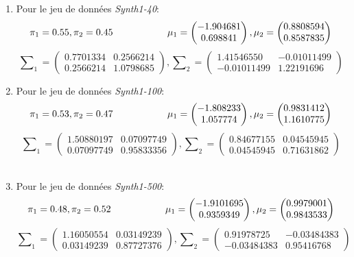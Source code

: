 \documentclass[a4paper,11pt]{article}
\begin{document}
\begin{enumerate}
  \item Pour le jeu de données \textit{Synth1-40}:
  \[ \pi_1  = 0.55, \pi_2  = 0.45 \hspace*{2cm} 
  \mu_1  = \begin{pmatrix}
    -1.904681 \\ 0.698841
  \end{pmatrix},
  \mu_2  = \begin{pmatrix}
    0.8808594 \\ 0.8587835
  \end{pmatrix}\]
  \[ \sum\nolimits_1 = \begin{pmatrix}
   0.7701334  & 0.2566214 \\
   0.2566214 & 1.0798685 
  \end{pmatrix},
  \sum\nolimits_2 = \begin{pmatrix}
  1.41546550  & -0.01011499 \\
  -0.01011499 & 1.22191696 
  \end{pmatrix}\]
  
  \item Pour le jeu de données \textit{Synth1-100}:
  \[ \pi_1  = 0.53, \pi_2  = 0.47\hspace*{2cm} 
   \mu_1  = \begin{pmatrix} -1.808233 \\ 1.057774 \end{pmatrix},
     \mu_2  = \begin{pmatrix} 0.9831412 \\ 1.1610775 \end{pmatrix}\]
  \[ \sum\nolimits_1 = \begin{pmatrix}
   1.50880197  & 0.07097749 \\
   0.07097749 & 0.95833356 
  \end{pmatrix},
  \sum\nolimits_2 = \begin{pmatrix}
  0.84677155  & 0.04545945 \\
  0.04545945 & 0.71631862 
  \end{pmatrix}\]  \\
  
  \item Pour le jeu de données \textit{Synth1-500}:
  \[ \pi_1  = 0.48, \pi_2  = 0.52\hspace*{2cm} 
   \mu_1  = \begin{pmatrix} -1.9101695 \\ 0.9359349 \end{pmatrix},
     \mu_2  = \begin{pmatrix} 0.9979001 \\ 0.9843533 \end{pmatrix}\]
  \[ \sum\nolimits_1 = \begin{pmatrix}
   1.16050554  & 0.03149239 \\
   0.03149239 & 0.87727376 
  \end{pmatrix},
  \sum\nolimits_2 = \begin{pmatrix}
  0.91978725  & -0.03484383 \\
  -0.03484383 & 0.95416768 
  \end{pmatrix}\] \\
  

\end{enumerate}
\end{document}
